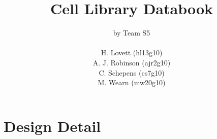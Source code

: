 \documentclass{desex3}         %
\newcommand{\cellname}[1] {\clearpage \section{#1} \makebox[\linewidth]{\rule{\textwidth}{0.4pt}}}
\begin{document}
\title{Cell Library Databook}

\author{by Team S5\\ \\ H. Lovett (hl13g10) \\ A. J. Robinson (ajr2g10) \\ C. Schepens (cs7g10) \\ M. Wearn (mw20g10)}
\maketitle
\cleardoublepage
\tableofcontents
\renewcommand*{\thesection}{\roman{section} }

\setcounter{section}{0}
\renewcommand*{\thesection}{\arabic{section} }













%

%


%
%
%
%




\appendix


\clearpage
\section{Design Detail}
\renewcommand{\cellname}[1] {\newpage \subsection{#1} \makebox[\linewidth]{\rule{\textwidth}{0.4pt}}}
\newcommand{\stickdiagram}[1]{\subsubsection*{Stick Diagram} \texttt{[image: \#1]}}
\newcommand{\transistor}[1]{\subsubsection*{Transistor Level Circuit Diagram} \texttt{[image: \#1]}}
\newcommand{\spicesim}[1]{\subsubsection*{HSpice Simulation} \texttt{[image: \#1]}}








\end{document}
